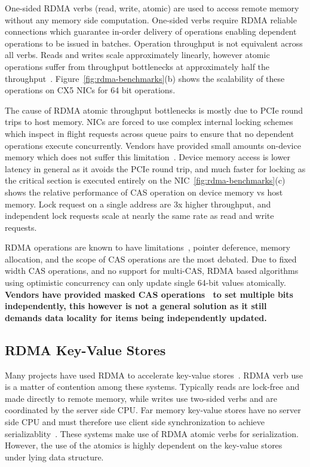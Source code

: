 One-sided RDMA verbs (read, write, atomic) are used to
access remote memory without any memory side computation.
One-sided verbs require RDMA reliable connections which
guarantee in-order delivery of operations enabling dependent
operations to be issued in batches. Operation throughput is
not equivalent across all verbs. Reads and writes scale
approximately linearly, however atomic operations suffer
from throughput bottlenecks at approximately half the
throughput~\cite{design-guidelines,sherman}.
Figure~\ref{fig:rdma-benchmarks}(b) shows the scalability of
these operations on CX5 NICs for 64 bit operations.

The cause of RDMA atomic throughput bottlenecks is mostly
due to PCIe round trips to host memory. NICs are forced to
use complex internal locking schemes which inspect in flight
requests across queue pairs to ensure that no dependent
operations execute concurrently. Vendors have provided small
amounts on-device memory which does not suffer this
limitation~\cite{device-memory}. Device memory access is
lower latency in general as it avoids the PCIe round trip,
and much faster for locking as the critical section is
executed entirely on the NIC~\ref{fig:rdma-benchmarks}(c)
shows the relative performance of CAS operation on device
memory vs host memory. Lock request on a single address are
3x higher throughput, and independent lock requests scale at
nearly the same rate as read and write requests.

RDMA operations are known to have limitations~\cite{prism},
pointer deference, memory allocation, and the scope of CAS
operations are the most debated. Due to fixed width CAS
operations, and no support for multi-CAS, RDMA based
algorithms using optimistic concurrency can only update
single 64-bit values atomically. \textbf{Vendors have provided
masked CAS operations~\cite{rdma-masked-cas} to set multiple
bits independently, this however is not a general solution
as it still demands data locality for items being
independently updated.}


\subsection{RDMA Key-Value Stores}

Many projects have used RDMA to accelerate key-value
stores~\cite{farm,erpc,herd,mica,pilaf,cell,faast,storm,memc3}.
RDMA verb use is a matter of contention among these systems.
Typically reads are lock-free and made directly to remote
memory, while writes use two-sided verbs and are coordinated
by the server side CPU.
Far memory key-value stores have no server side CPU and must
therefore use client side synchronization to achieve
serializablity~\cite{rolex,fusee,clover,sherman,ford,race}.
These systems make use of RDMA atomic verbs for
serialization. However, the use of the atomics is highly
dependent on the key-value stores under lying data
structure.


